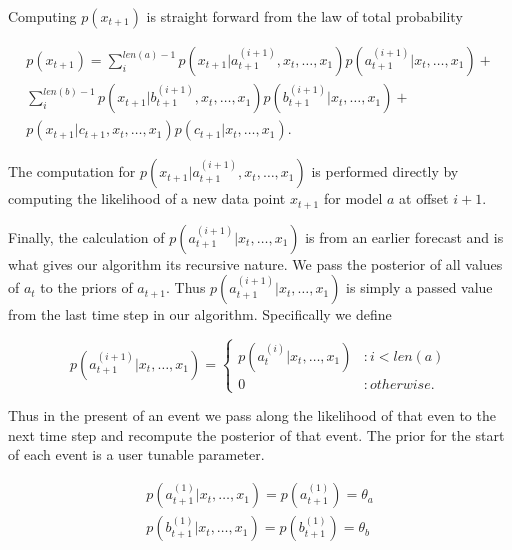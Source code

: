 Computing $p(x_{t + 1})$ is straight forward from the law of total probability

\begin{equation}
	\begin{split}
		p(x_{t + 1}) = \sum_{i}^{len(a) - 1}p(x_{t + 1}|a_{t + 1}^{(i + 1)}, x_{t}, \ldots, x_{1})
						   p(a_{t + 1}^{(i + 1)}|x_{t}, \ldots, x_{1}) + \\
				      \sum_{i}^{len(b) - 1}p(x_{t + 1}|b_{t + 1}^{(i + 1)}, x_{t}, \ldots, x_{1}) 
						   p(b_{t + 1}^{(i + 1)}|x_{t}, \ldots, x_{1}) + \\
	        			      p(x_{t + 1}|c_{t + 1}, x_{t}, \ldots, x_{1})p(c_{t + 1}|x_{t}, \ldots, x_{1}).
	\end{split}
\end{equation}

The computation for $p(x_{t + 1}|a^{(i + 1)}_{t + 1}, x_{t}, \ldots, x_{1})$ is performed directly by computing the likelihood of a new data point $x_{t + 1}$ for model $a$ at offset $i + 1$.

Finally, the calculation of $p(a_{t + 1}^{(i + 1)}|x_{t}, \ldots, x_{1})$ is from an earlier forecast and is what gives our algorithm its recursive nature.  We pass the posterior of all values of $a_{t}$ to the priors of $a_{t + 1}.$  Thus $p(a_{t + 1}^{(i + 1)}|x_{t}, \ldots, x_{1})$ is simply a passed value from the last time step in our algorithm.  Specifically we define 

\begin{equation}
	p(a_{t + 1}^{(i + 1)} | x_{t}, \ldots, x_{1}) = 
		\begin{cases}
			p(a_{t}^{(i)}|x_{t}, \ldots, x_{1}) & : i < len(a) \\
			0 & : otherwise.
		\end{cases}
\end{equation}

Thus in the present of an event we pass along the likelihood of that even to the next time step and recompute the posterior of that event.  The prior for the start of each event is a user tunable parameter.  

\begin{equation}
	\begin{split}
		p(a_{t + 1}^{(1)}|x_{t}, \ldots, x_{1}) = p(a_{t + 1}^{(1)}) = \theta_a \\
		p(b_{t + 1}^{(1)}|x_{t}, \ldots, x_{1}) = p(b_{t + 1}^{(1)}) = \theta_b
	\end{split}
\end{equation}


